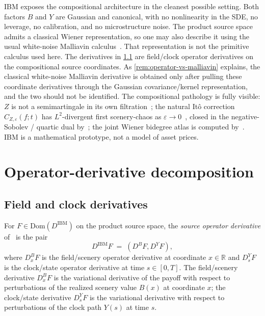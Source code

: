 \documentclass[11pt,reqno]{amsart}
\theoremstyle{plain}
\theoremstyle{definition}
\theoremstyle{remark}
\newcommand{\R}{\mathbb R}
\newcommand{\IBM}{Z}
\newcommand{\Bvar}{B}
\newcommand{\Yclock}{Y}
\begin{document}
IBM exposes the compositional architecture in the cleanest possible
setting. Both factors $\Bvar$ and $\Yclock$ are Gaussian and canonical,
with no nonlinearity in the SDE, no leverage, no calibration, and no
microstructure noise. The product source space admits a classical
Wiener representation, so one may also describe it using the usual
white-noise Malliavin calculus~\cite{NualartMalliavin}. That
representation is not the primitive calculus used here. The derivatives
in \cref{sec:DB-DY} are field/clock operator derivatives on the
compositional source coordinates. As
\cref{rem:operator-vs-malliavin} explains, the classical white-noise
Malliavin derivative is obtained only after pulling these coordinate
derivatives through the Gaussian covariance/kernel representation, and
the two should not be identified. The compositional pathology is
fully visible: $\IBM$ is not a semimartingale in its own
filtration~\cite{EnergyFirst}; the natural It\^o correction
$C_{\IBM,\varepsilon}(f;t)$ has $L^{2}$-divergent first
scenery-chaos as
$\varepsilon\to 0$~\cite[Prop.~5.1]{EnergyFirst}, closed in the
negative-Sobolev / quartic dual by~\cite{FCDC}; the joint
Wiener bidegree atlas is computed by~\cite{BidegreeAtlas}. IBM
is a mathematical prototype, not a model of asset prices.

\section{Operator-derivative decomposition}\label{sec:operator-derivatives}

\subsection{Field and clock derivatives}\label{sec:DB-DY}

For $F\in\mathrm{Dom}(D^{\mathrm{IBM}})$ on the product source space,
the \emph{source operator derivative}
of~\cite[\S 7.2]{OperatorClarkOcone} is the pair
\begin{equation}\label{eq:DIBM}
  D^{\mathrm{IBM}}F\;=\;(D^{\Bvar}F,D^{\Yclock}F),
\end{equation}
where $D^{\Bvar}_{x}F$ is the field/scenery operator derivative
at coordinate $x\in\R$ and $D^{\Yclock}_{s}F$ is the
clock/state operator derivative at time $s\in[0,T]$. The
field/scenery derivative $D^{\Bvar}_{x}F$ is the variational
derivative of the payoff with respect to perturbations of the
realized scenery value $\Bvar(x)$ at coordinate $x$; the
clock/state derivative $D^{\Yclock}_{s}F$ is the variational
derivative with respect to perturbations of the clock path
$\Yclock(s)$ at time $s$.
\end{document}
